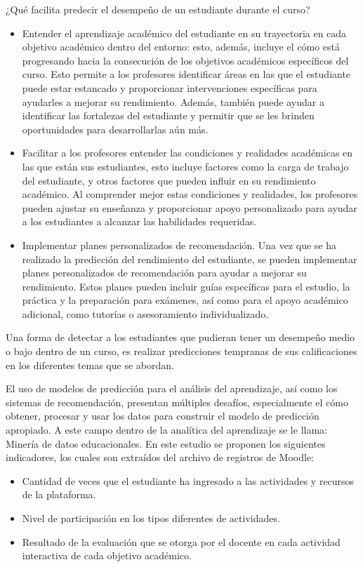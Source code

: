 ¿Qué facilita predecir el desempeño de un estudiante durante el curso?
\begin{itemize}

    \item Entender el aprendizaje académico del estudiante en su trayectoria en cada objetivo 
    académico dentro del entorno: esto, además, incluye el cómo está progresando hacia la consecución de 
    los objetivos académicos específicos del curso. Esto permite a los profesores identificar 
    áreas en las que el estudiante puede estar estancado y proporcionar intervenciones específicas para 
    ayudarles a mejorar su rendimiento. Además, también puede ayudar a identificar las fortalezas del 
    estudiante y permitir que se les brinden oportunidades para desarrollarlas aún más.

    \item Facilitar a los profesores entender las condiciones y realidades académicas 
    en las que están sus estudiantes, esto incluye factores como la carga de trabajo del estudiante, y otros factores que pueden influir en su 
    rendimiento académico. Al comprender mejor estas condiciones y realidades, los profesores 
    pueden ajustar su enseñanza y proporcionar apoyo personalizado para ayudar a los estudiantes 
    a alcanzar las habilidades requeridas.

    \item Implementar planes personalizados de recomendación. Una vez que se ha realizado la predicción 
    del rendimiento del estudiante, se pueden implementar planes personalizados de recomendación para 
    ayudar a mejorar su rendimiento. Estos planes pueden incluir guías específicas 
    para el estudio, la práctica y la preparación para exámenes, así como para el apoyo académico adicional, 
    como tutorías o asesoramiento individualizado.

\end{itemize}

Una forma de detectar a los estudiantes que pudieran tener un desempeño medio o bajo dentro de un curso, 
es realizar predicciones tempranas de sus calificaciones en los diferentes temas que se abordan.

El uso de modelos de predicción para el análisis del aprendizaje, así como los sistemas de recomendación, 
presentan múltiples desafíos, especialmente el cómo obtener, procesar y usar los datos para construir el modelo de 
predicción apropiado. A este campo dentro de la analítica del aprendizaje se le llama: Minería de datos educacionales. 
En este estudio se proponen los siguientes indicadores, los cuales son extraídos del archivo de registros de Moodle: 
\begin{itemize}
    \item Cantidad de veces que el estudiante ha ingresado a las actividades y recursos de la plataforma.
    \item Nivel de participación en los tipos diferentes de actividades.
    \item Resultado de la evaluación que se otorga por el docente en cada actividad interactiva de cada objetivo académico.
\end{itemize}

